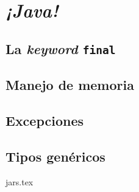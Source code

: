 \chapter{\textit{¡Java!}}
  \label{ch:java-2}
  \section{La \textit{keyword} \texttt{final}}
    \label{sec:final}
  \section{Manejo de memoria}
    \label{sec:memory}
  \section{Excepciones}
    \label{sec:exceptions}
  \section{Tipos genéricos}
    \label{sec:generics}
  {jars.tex}
  \nocite{*}
  \printbibliography[keyword=java-3]
%
